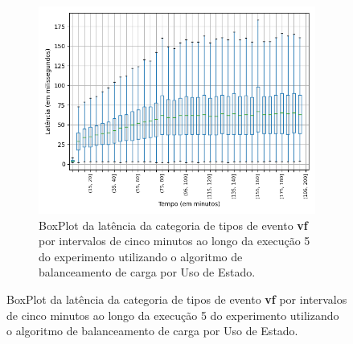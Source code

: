 

\begin{figure}
\centering
\begin{subfigure}{.5\textwidth}
\centering
\includegraphics[width=\textwidth]{figuras/graphics/boxplot_10-dez-su_vf.png}
\caption{BoxPlot da latência da categoria de tipos de evento \textbf{vf} por intervalos de cinco minutos ao longo da execução 5 do experimento utilizando o algoritmo de balanceamento de carga por Uso de Estado.}
\label{fig:BoxPlot_vf_SU_10-dez-su}
\end{subfigure}%


\end{figure}
